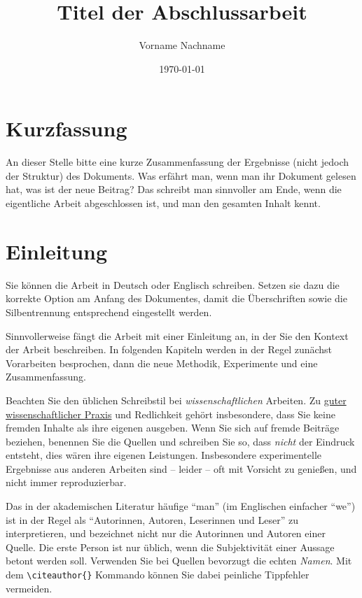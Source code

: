 \documentclass[german]{abarbeit}
\title{Titel der Abschlussarbeit}
\author{Vorname Nachname}
\date{\today} %
\begin{document}
\maketitle
\frontmatter
\chapter*{Kurzfassung}
An dieser Stelle bitte eine kurze Zusammenfassung der Ergebnisse (nicht jedoch
der Struktur) des Dokuments. Was erfährt man, wenn man ihr Dokument gelesen hat,
was ist der neue Beitrag?
Das schreibt man sinnvoller am Ende, wenn die eigentliche Arbeit abgeschlossen
ist, und man den gesamten Inhalt kennt.

\tableofcontents

\mainmatter
\chapter{Einleitung}

Sie können die Arbeit in Deutsch oder Englisch schreiben. Setzen sie dazu die korrekte Option am Anfang des Dokumentes, damit die Überschriften sowie die Silbentrennung entsprechend eingestellt werden.

Sinnvollerweise fängt die Arbeit mit einer Einleitung an, in der Sie den
Kontext der Arbeit beschreiben. In folgenden Kapiteln werden in der Regel
zunächst Vorarbeiten besprochen, dann die neue Methodik, Experimente und eine
Zusammenfassung.

Beachten Sie den üblichen Schreibstil bei \emph{wissenschaftlichen} Arbeiten.
Zu \href{https://www.tu-dortmund.de/forschung/forschungsethik/gute-wissenschaftliche-praxis/}{guter wissenschaftlicher Praxis}
und Redlichkeit gehört insbesondere, dass Sie keine fremden Inhalte als ihre eigenen ausgeben.
Wenn Sie sich auf fremde Beiträge beziehen, benennen Sie die Quellen und schreiben Sie
so, dass \emph{nicht} der Eindruck entsteht, dies wären ihre eigenen Leistungen.
Insbesondere experimentelle Ergebnisse aus anderen Arbeiten sind -- leider --
oft mit Vorsicht zu genießen, und nicht immer reproduzierbar.

Das in der akademischen Literatur häufige \enquote{man} (im Englischen einfacher \enquote{we}) ist in der Regel
als \enquote{Autorinnen, Autoren, Leserinnen und Leser} zu interpretieren, und bezeichnet nicht nur die Autorinnen und Autoren einer Quelle.
Die erste Person ist nur üblich, wenn die Subjektivität einer Aussage betont werden soll.
Verwenden Sie bei Quellen bevorzugt die echten \emph{Namen}.
Mit dem \texttt{\textbackslash{}citeauthor\{\}} Kommando können Sie dabei
peinliche Tippfehler vermeiden.
\end{document}

